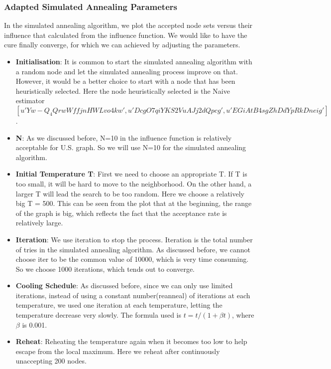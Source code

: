 \documentclass{article}
\begin{document}
\FloatBarrier
\subsubsection{Adapted Simulated Annealing Parameters}%

In the simulated annealing algorithm, we plot the accepted node sets versus their influence that calculated from the influence function. We would like to have the cure finally converge, for which we can achieved by adjusting the parameters. 

\begin{itemize}
    \item \textbf{Initialisation}: It is common to start the simulated annealing algorithm with a random node and let the simulated annealing process improve on that. However, it would be a better choice to start with a node that has been heuristically selected. Here the node heuristically selected is the Naive estimator $[u'Yw-Q_4QrwWffjnHWLvo4kw', u'DcgO7qiYKS2VuAJj2dQpcg', u'EGiAtB4sgZhDdYpRkDneig']$ . 
    \item \textbf{N}: As we discussed before, N=10 in the influence function is relatively acceptable for U.S. graph. So we will use N=10 for the simulated annealing algorithm. 
    \item \textbf{Initial Temperature T}: First we need to choose an appropriate T. If T is too small, it will be hard to move to the neighborhood. On the other hand, a larger T will lead the search to be too random. Here we choose a relatively big T = 500. This can be seen from the plot that at the beginning, the range of the graph is big, which reflects the fact that the acceptance rate is relatively large. 
    \item \textbf{Iteration}: We use iteration to stop the process. Iteration is the total number of tries in the simulated annealing algorithm. As discussed before, we cannot choose iter to be the common value of 10000, which is very time consuming. So we choose 1000 iterations, which tends out to converge.
    \item \textbf{Cooling Schedule}: As discussed before, since we can only use limited iterations, instead of using a constant number(reanneal) of iterations at each temperature, we used  one iteration at each temperature, letting the temperature decrease very slowly. The formula used is $t = t/(1+\beta t)$, where $\beta$ is 0.001. 
    \item \textbf{Reheat}: Reheating the temperature again when it becomes too low to help escape from the local maximum. Here we reheat after continuously unaccepting 200 nodes.
\end{itemize}
\end{document}
